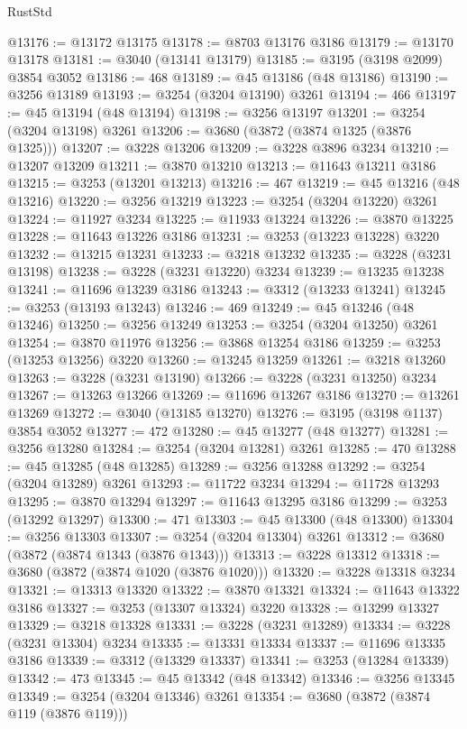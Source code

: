 \begin{lexlean}{RustStd}
\begin{coremodule}
{\begin{coremodule}
{{{{{{{{{{{{{{{{{{{{{{{{{{{{{{{{{{{{{@13176 := @13172 @13175
@13178 := @8703 @13176 @3186
@13179 := @13170 @13178
@13181 := @3040 (@13141 @13179)
@13185 := @3195 (@3198 @2099) @3854 @3052
@13186 := 468
@13189 := @45 @13186 (@48 @13186)
@13190 := @3256 @13189
@13193 := @3254 (@3204 @13190) @3261
@13194 := 466
@13197 := @45 @13194 (@48 @13194)
@13198 := @3256 @13197
@13201 := @3254 (@3204 @13198) @3261
@13206 := @3680 (@3872 (@3874 @1325 (@3876 @1325)))
@13207 := @3228 @13206
@13209 := @3228 @3896 @3234
@13210 := @13207 @13209
@13211 := @3870 @13210
@13213 := @11643 @13211 @3186
@13215 := @3253 (@13201 @13213)
@13216 := 467
@13219 := @45 @13216 (@48 @13216)
@13220 := @3256 @13219
@13223 := @3254 (@3204 @13220) @3261
@13224 := @11927 @3234
@13225 := @11933 @13224
@13226 := @3870 @13225
@13228 := @11643 @13226 @3186
@13231 := @3253 (@13223 @13228) @3220
@13232 := @13215 @13231
@13233 := @3218 @13232
@13235 := @3228 (@3231 @13198)
@13238 := @3228 (@3231 @13220) @3234
@13239 := @13235 @13238
@13241 := @11696 @13239 @3186
@13243 := @3312 (@13233 @13241)
@13245 := @3253 (@13193 @13243)
@13246 := 469
@13249 := @45 @13246 (@48 @13246)
@13250 := @3256 @13249
@13253 := @3254 (@3204 @13250) @3261
@13254 := @3870 @11976
@13256 := @3868 @13254 @3186
@13259 := @3253 (@13253 @13256) @3220
@13260 := @13245 @13259
@13261 := @3218 @13260
@13263 := @3228 (@3231 @13190)
@13266 := @3228 (@3231 @13250) @3234
@13267 := @13263 @13266
@13269 := @11696 @13267 @3186
@13270 := @13261 @13269
@13272 := @3040 (@13185 @13270)
@13276 := @3195 (@3198 @1137) @3854 @3052
@13277 := 472
@13280 := @45 @13277 (@48 @13277)
@13281 := @3256 @13280
@13284 := @3254 (@3204 @13281) @3261
@13285 := 470
@13288 := @45 @13285 (@48 @13285)
@13289 := @3256 @13288
@13292 := @3254 (@3204 @13289) @3261
@13293 := @11722 @3234
@13294 := @11728 @13293
@13295 := @3870 @13294
@13297 := @11643 @13295 @3186
@13299 := @3253 (@13292 @13297)
@13300 := 471
@13303 := @45 @13300 (@48 @13300)
@13304 := @3256 @13303
@13307 := @3254 (@3204 @13304) @3261
@13312 := @3680 (@3872 (@3874 @1343 (@3876 @1343)))
@13313 := @3228 @13312
@13318 := @3680 (@3872 (@3874 @1020 (@3876 @1020)))
@13320 := @3228 @13318 @3234
@13321 := @13313 @13320
@13322 := @3870 @13321
@13324 := @11643 @13322 @3186
@13327 := @3253 (@13307 @13324) @3220
@13328 := @13299 @13327
@13329 := @3218 @13328
@13331 := @3228 (@3231 @13289)
@13334 := @3228 (@3231 @13304) @3234
@13335 := @13331 @13334
@13337 := @11696 @13335 @3186
@13339 := @3312 (@13329 @13337)
@13341 := @3253 (@13284 @13339)
@13342 := 473
@13345 := @45 @13342 (@48 @13342)
@13346 := @3256 @13345
@13349 := @3254 (@3204 @13346) @3261
@13354 := @3680 (@3872 (@3874 @119 (@3876 @119)))
}}}}}}}}}}}}}}}}}}}}}}}}}}}}}}}}}}}}}
\end{coremodule}}
\end{coremodule}
\end{lexlean}
